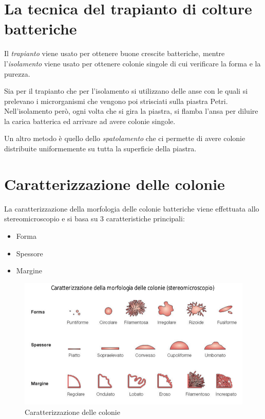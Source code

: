 \documentclass[11pt]{book}
\begin{document}
\section{La tecnica del trapianto di colture batteriche}
Il \emph{trapianto} viene usato per ottenere buone crescite batteriche, mentre l'\emph{isolamento} viene usato per ottenere colonie singole di cui verificare la forma e la purezza.

Sia per il trapianto che per l'isolamento si utilizzano delle anse con le quali si prelevano i microrganismi che vengono poi strisciati sulla piastra Petri. Nell'isolamento però, ogni volta che si gira la piastra, si flamba l'ansa per diluire la carica batterica ed arrivare ad avere colonie singole.

Un altro metodo è quello dello \emph{spatolamento} che ci permette di avere colonie distribuite uniformemente su tutta la superficie della piastra.

\clearpage
\section{Caratterizzazione delle colonie}
La caratterizzazione della morfologia delle colonie batteriche viene effettuata allo stereomicroscopio e si basa su 3 caratteristiche principali:
\begin{itemize}
\item Forma 
\item Spessore
\item Margine
\end{itemize}

\begin{figure}[htp]
\centering
\includegraphics[scale=0.5]{img/Forma delle colonie.png}
\caption{Caratterizzazione delle colonie}
\label{}
\end{figure}
\end{document}
